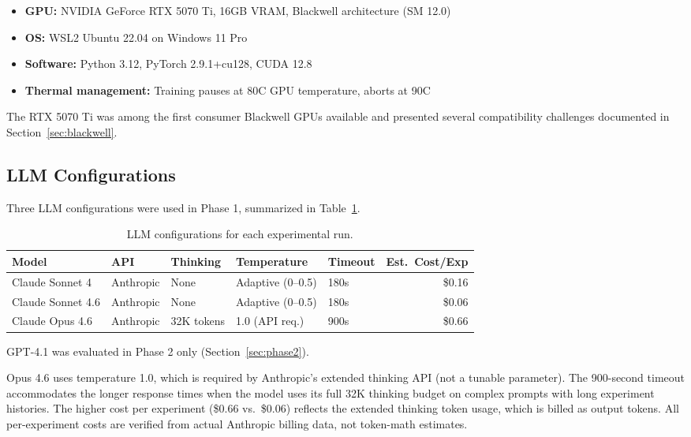 \documentclass[11pt]{article}
\begin{document}
\begin{itemize}[leftmargin=*]
    \item \textbf{GPU:} NVIDIA GeForce RTX 5070 Ti, 16GB VRAM, Blackwell architecture (SM 12.0)
    \item \textbf{OS:} WSL2 Ubuntu 22.04 on Windows 11 Pro
    \item \textbf{Software:} Python 3.12, PyTorch 2.9.1+cu128, CUDA 12.8
    \item \textbf{Thermal management:} Training pauses at 80\textdegree C GPU temperature, aborts at 90\textdegree C
\end{itemize}

The RTX 5070 Ti was among the first consumer Blackwell GPUs available and presented several compatibility challenges documented in Section~\ref{sec:blackwell}.

\subsection{LLM Configurations}
\label{sec:llm_configs}

Three LLM configurations were used in Phase 1, summarized in Table~\ref{tab:llm_configs}.

\begin{table}[H]
\centering
\caption{LLM configurations for each experimental run.}
\label{tab:llm_configs}
\begin{tabular}{lllllr}
\toprule
\textbf{Model} & \textbf{API} & \textbf{Thinking} & \textbf{Temperature} & \textbf{Timeout} & \textbf{Est.\ Cost/Exp} \\
\midrule
Claude Sonnet 4     & Anthropic     & None       & Adaptive (0--0.5)  & 180s  & \$0.16 \\
Claude Sonnet 4.6   & Anthropic     & None       & Adaptive (0--0.5)  & 180s  & \$0.06 \\
Claude Opus 4.6     & Anthropic     & 32K tokens & 1.0 (API req.)     & 900s  & \$0.66 \\
\bottomrule
\end{tabular}
\end{table}

GPT-4.1 was evaluated in Phase 2 only (Section~\ref{sec:phase2}).

Opus 4.6 uses temperature 1.0, which is required by Anthropic's extended thinking API (not a tunable parameter). The 900-second timeout accommodates the longer response times when the model uses its full 32K thinking budget on complex prompts with long experiment histories. The higher cost per experiment (\$0.66 vs.\ \$0.06) reflects the extended thinking token usage, which is billed as output tokens. All per-experiment costs are verified from actual Anthropic billing data, not token-math estimates.
\end{document}
